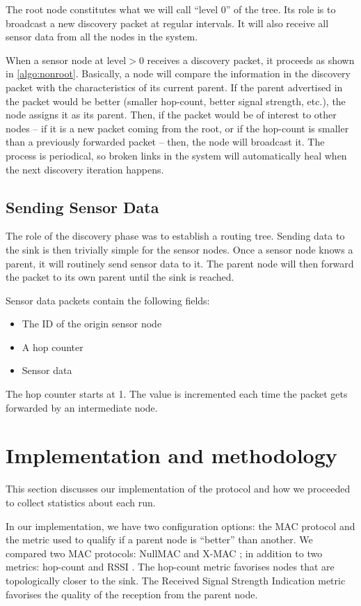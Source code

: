 \documentclass[a4paper]{llncs}
\begin{document}
The root node constitutes what we will call \enquote{level 0} of the tree.
Its role is to broadcast a new discovery packet at regular intervals.
It will also receive all sensor data from all the nodes in the system.

When a sensor node at $\text{level} > 0$ receives a discovery packet, it proceeds as shown in \autoref{algo:nonroot}.
Basically, a node will compare the information in the discovery packet with the characteristics of its current parent.
If the parent advertised in the packet would be better (smaller hop-count, better signal strength, etc.), the node assigns it as its parent.
Then, if the packet would be of interest to other nodes -- if it is a new packet coming from the root, or if the hop-count is smaller than a previously forwarded packet -- then, the node will broadcast it.
The process is periodical, so broken links in the system will automatically heal when the next discovery iteration happens.

\subsection{Sending Sensor Data}

The role of the discovery phase was to establish a routing tree.
Sending data to the sink is then trivially simple for the sensor nodes.
Once a sensor node knows a parent, it will routinely send sensor data to it.
The parent node will then forward the packet to its own parent until the sink is reached.

Sensor data packets contain the following fields:

\begin{itemize}
\item The ID of the origin sensor node
\item A hop counter
\item Sensor data
\end{itemize}

The hop counter starts at 1.
The value is incremented each time the packet gets forwarded by an intermediate node.

\section{Implementation and methodology}

This section discusses our implementation of the protocol and how we proceeded to collect statistics about each run.

In our implementation, we have two configuration options: the MAC protocol and the metric used to qualify if a parent node is \enquote{better} than another.
We compared two MAC protocols: NullMAC and X-MAC \autocite{xmac}; in addition to two metrics: hop-count and RSSI \autocite{rssi}.
The hop-count metric favorises nodes that are topologically closer to the sink.
The Received Signal Strength Indication metric favorises the quality of the reception from the parent node.
\end{document}
